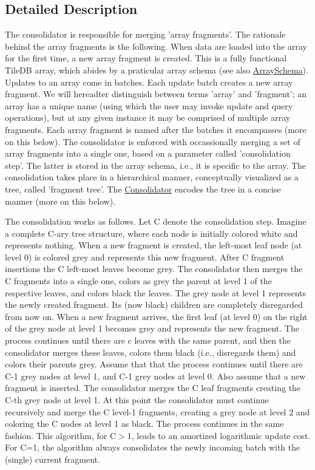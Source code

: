 \subsection{Detailed Description}
The consolidator is responsible for merging 'array fragments'. The rationale behind the array fragments is the following. When data are loaded into the array for the first time, a new array fragment is created. This is a fully functional Tile\+D\+B array, which abides by a praticular array schema (see also \hyperlink{classArraySchema}{Array\+Schema}). Updates to an array come in batches. Each update batch creates a new array fragment. We will hereadter distinguish between terms 'array' and 'fragment'; an array has a unique name (using which the user may invoke update and query operations), but at any given instance it may be comprised of multiple array fragments. Each array fragment is named after the batches it encompasses (more on this below). The consolidator is enforced with occassionally merging a set of array fragments into a single one, based on a parameter called 'consolidation step'. The latter is stored in the array schema, i.\+e., it is specific to the array. The consolidation takes place in a hierarchical manner, conceptually visualized as a tree, called 'fragment tree'. The \hyperlink{classConsolidator}{Consolidator} encodes the tree in a concise manner (more on this below).

The consolidation works as follows. Let C denote the consolidation step. Imagine a complete C-\/ary tree structure, where each node is initially colored white and represents nothing. When a new fragment is created, the left-\/most leaf node (at level 0) is colored grey and represents this new fragment. After C fragment insertions the C left-\/most leaves become grey. The consolidator then merges the C fragments into a single one, colors as grey the parent at level 1 of the respective leaves, and colors black the leaves. The grey node at level 1 represents the newly created fragment. Its (now black) children are completely disregarded from now on. When a new fragment arrives, the first leaf (at level 0) on the right of the grey node at level 1 becomes grey and represents the new fragment. The process continues until there are c leaves with the same parent, and then the consolidator merges these leaves, colors them black (i.\+e., disregards them) and colors their parents grey. Assume that that the process continues until there are C-\/1 grey nodes at level 1, and C-\/1 grey nodes at level 0. Also assume that a new fragment is inserted. The consolidator merges the C leaf fragments creating the C-\/th grey node at level 1. At this point the consolidator must continue recursively and merge the C level-\/1 fragments, creating a grey node at level 2 and coloring the C nodes at level 1 as black. The process continues in the same fashion. This algorithm, for C$>$1, leads to an amortized logarithmic update cost. For C=1, the algorithm always consolidates the newly incoming batch with the (single) current fragment.

